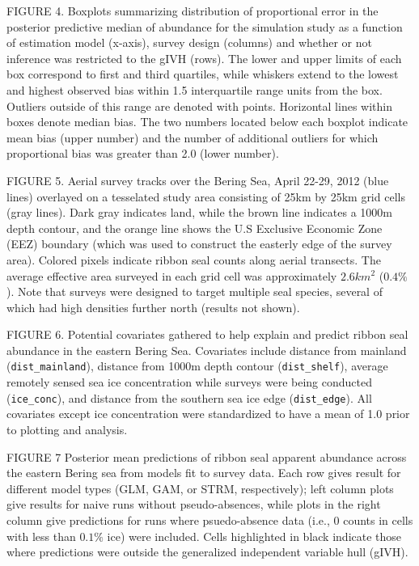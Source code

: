 \documentclass[12pt,english]{article}
\begin{document}
\begin{spacing}{1.9}
FIGURE 4.  Boxplots summarizing distribution of proportional error in the posterior predictive median of abundance for the simulation study as a function of estimation model (x-axis), survey design (columns) and whether or not inference was restricted to the gIVH (rows).  The lower and upper limits of each box correspond to first and third quartiles, while whiskers extend to the lowest and highest observed bias within 1.5 interquartile range units from the box.  Outliers outside of this range are denoted with points.  Horizontal lines within boxes denote median bias.  The two numbers located below each boxplot indicate mean bias (upper number) and the number of additional outliers for which proportional bias was greater than 2.0 (lower number).

FIGURE 5. Aerial survey tracks over the Bering Sea, April 22-29, 2012 (blue lines) overlayed on a tesselated study area consisting of 25km by 25km grid cells (gray lines).  Dark gray indicates land, while the brown line indicates a 1000m depth contour, and the orange line shows the U.S Exclusive Economic Zone (EEZ) boundary (which was used to construct the easterly edge of the survey area). Colored pixels indicate ribbon seal counts along aerial transects. The average effective area surveyed in each grid cell was approximately $2.6km^2$ ($0.4\%$).  Note that surveys were designed to target multiple seal species, several of which had high densities further north (results not shown).

FIGURE 6. Potential covariates gathered to help explain and predict ribbon seal abundance in the eastern Bering Sea.  Covariates include distance from mainland (\texttt{dist\_mainland}), distance from 1000m depth contour (\texttt{dist\_shelf}), average remotely sensed sea ice concentration while surveys were being conducted (\texttt{ice\_conc}), and distance from the southern sea ice edge (\texttt{dist\_edge}).  All covariates except ice concentration were standardized to have a mean of 1.0 prior to plotting and analysis.

FIGURE 7  Posterior mean predictions of ribbon seal apparent abundance across the eastern Bering sea from models fit to survey data.  Each row gives result for different model types (GLM, GAM, or STRM, respectively); left column plots give results for naive runs without pseudo-absences, while plots in the right column give predictions for runs where psuedo-absence data (i.e., 0 counts in cells with less than $0.1\%$ ice) were included. Cells highlighted in black indicate those where predictions were outside the generalized independent variable hull (gIVH).


\end{spacing}
\end{document}

